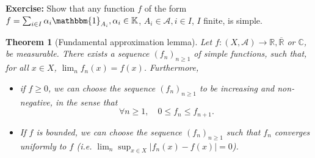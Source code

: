 \documentclass[12pt]{article}
\newtheorem{theorem}{Theorem}[section]
\theoremstyle{definition}
\begin{document}
\textbf{Exercise:} Show that any function $f$ of the form $f = \sum_{i \in I} \alpha_i \mathbbm{1}_{A_i}, \alpha_i \in \mathbb{K}$, $A_i \in \mathscr{A}, i \in I$, $I$ finite, is simple.

\begin{theorem}[Fundamental approximation lemma]
Let $f : (X, \mathscr{A}) \to \mathbb{R}, \overline{\mathbb{R}}$ or $\mathbb{C}$, be measurable. There exists a sequence $(f_n)_{n \geq 1}$ of simple functions, such that, for all $x \in X$, $\lim_n f_n(x) = f(x)$. Furthermore,

\begin{itemize}
    \item[(a)] if $f \geq 0$, we can choose the sequence $(f_n)_{n \geq 1}$ to be increasing and non-negative, in the sense that
$$ \forall n \geq 1, \quad 0 \leq f_n \leq f_{n+1}. $$

    \item[(b)] If $f$ is bounded, we can choose the sequence $(f_n)_{n \geq 1}$ such that $f_n$ converges uniformly to $f$ (i.e. $\lim_n \sup_{x \in X} |f_n(x) - f(x)| = 0$).
\end{itemize}
\end{theorem}
\end{document}
